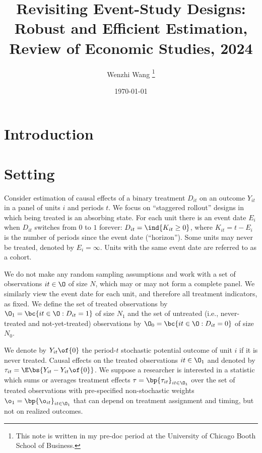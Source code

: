 \documentclass[12pt]{article}
\theoremstyle{definition}
\begin{document}

\title{\bf Revisiting Event-Study Designs: Robust and Efficient Estimation, Review of Economic Studies, 2024}
\author{Wenzhi Wang \thanks{This note is written in my pre-doc period at the University of Chicago Booth School of Business.} } 
\date{\today}
\maketitle


\citet{borusyakRevisitingEventStudyDesigns2024}

\section{Introduction}

\section{Setting} \label{sec_setting}

\citet{borusyakRevisitingEventStudyDesigns2024}

Consider estimation of causal effects of a binary treatment $D_{it}$ on an outcome $Y_{it}$ in a panel of units $i$ and periods $t$. We focus on ``staggered rollout'' designs in which being treated is an absorbing state. For each unit there is an event date $E_i$ when $D_{it}$ switches from $0$ to $1$ forever: $D_{it} = \ind{K_{it} \geq 0}$, where $K_{it} = t - E_i$ is the number of periods since the event date (``horizon''). Some units may never be treated, denoted by $E_i = \infty$. Units with the same event date are referred to as a cohort. 

We do not make any random sampling assumptions and work with a set of observations $it \in \O$ of size $N$, which may or may not form a complete panel. We similarly view the event date for each unit, and therefore all treatment indicators, as fixed. We define the set of treated observations by $\O_1 = \bc{it \in \O: D_{it} = 1}$ of size $N_1$ and the set of untreated (i.e., never-treated and not-yet-treated) observations by $\O_0 = \bc{it \in \O: D_{it} = 0}$ of size $N_0$.

We denote by $Y_{it}\of{0}$ the period-$t$ stochastic potential outcome of unit $i$ if it is never treated. Causal effects on the treated observations $it \in \O_1$ and denoted by $\tau_{it} = \E\bs{Y_{it} - Y_{it}\of{0}}$. We suppose a researcher is interested in a statistic which sums or averages treatment effects $\tau = \bp{\tau_{it}}_{it \in \O_1}$ over the set of treated observations with pre-specified non-stochastic weights $\o_1 = \bp{\o_{it}}_{it \in \O_1}$ that can depend on treatment assignment and timing, but not on realized outcomes. 
\end{document}
